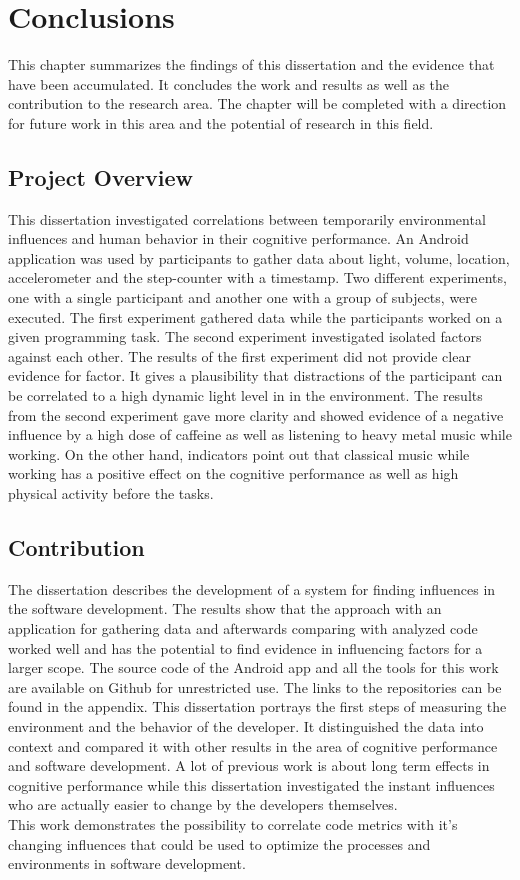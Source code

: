 \chapter{Conclusions}
This chapter summarizes the findings of this dissertation and the evidence that have been accumulated. It concludes the work and results as well as the contribution to the research area. 
The chapter will be completed with a direction for future work in this area and the potential of research in this field. 

\section{Project Overview}
This dissertation investigated correlations between temporarily environmental influences and human behavior in their cognitive performance. 
An Android application was used by participants to gather data about light, volume, location, accelerometer and the step-counter with a timestamp.  
Two different experiments, one with a single participant and another one with a group of subjects, were executed. The first experiment gathered data while the participants worked on a given programming task. The second experiment investigated isolated factors against each other.
The results of the first experiment did not provide clear evidence for factor. It gives a plausibility that distractions of the participant can be correlated to a high dynamic light level in in the environment. 
The results from the second experiment gave more clarity and showed evidence of a negative influence by a high dose of caffeine as well as listening to heavy metal music while working. On the other hand, indicators point out that classical music while working has a positive effect on the cognitive performance  as well as high physical activity before the tasks. 

\section{Contribution}
The dissertation describes the development of a system for finding influences in the software development. The results show that the approach with an application for gathering data and afterwards comparing with analyzed code worked well and has the potential to find evidence in influencing factors for a larger scope.
The source code of the Android app and all the tools for this work are available on Github for unrestricted use. The links to the repositories can be found in the appendix. 
\bigbreak
This dissertation portrays the first steps of measuring the environment and the behavior of the developer. It distinguished the data into context and compared it with other results in the area of cognitive performance and software development. A lot of previous work is about long term effects in cognitive performance while this dissertation investigated the instant influences who are actually easier to change by the developers themselves.\\
This work demonstrates the possibility to correlate code metrics with it's changing influences that could be used to optimize the processes and environments in software development. 

